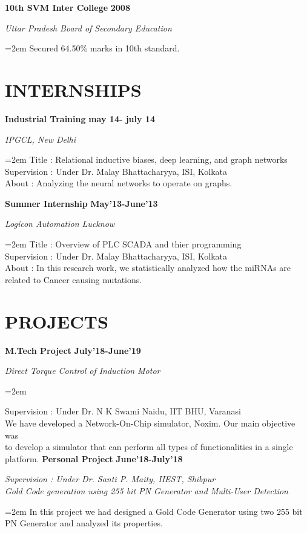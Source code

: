 \documentclass[paper=a4,fontsize=11pt]{scrartcl} %
\newcommand{\sepspace}{\vspace*{1em}}		%
\newcommand{\NewPart}[1]{\section*{\uppercase{#1}}}
\newcommand{\EducationEntry}[4]{
		\noindent \textbf{#1} \hfill      %
		\textbf{#2} \par  %
		\noindent \textit{#3} \par        %
		\noindent\hangindent=2em\hangafter=0 \small #4 %
		\normalsize \par}
\newcommand{\WorkEntry}[4]{				  %
		\noindent \textbf{#1} \hfill      %
		\textbf{#2} \par  %
		\noindent \textit{#3} \par              %
		\noindent\hangindent=2em\hangafter=0 \small #4 %
		\normalsize \par}
\begin{document}
            \EducationEntry{10th SVM Inter College}{2008}{Uttar Pradesh Board of
            Secondary Education}{Secured 64.50\% marks in 10th standard.}

    \NewPart{Internships}
{}
           \WorkEntry{Industrial Training} %
           {may 14- july 14} %
           {IPGCL, New Delhi} %
           {Title : Relational inductive biases, deep learning, and graph networks\\Supervision : Under Dr. Malay Bhattacharyya, ISI, Kolkata\\About : Analyzing the neural networks to operate on graphs.} %
    \sepspace
             \sepspace
    \WorkEntry{Summer Internship}{May'13-June'13}{Logicon Automation Lucknow}{Title : Overview of PLC SCADA and thier programming\\Supervision : Under Dr. Malay Bhattacharyya, ISI, Kolkata\\About : In this research work, we statistically analyzed how the miRNAs are related to Cancer causing
    mutations.}    

\NewPart{Projects}{}

        \WorkEntry{M.Tech Project} %
        {July'18-June'19} %
        {Direct Torque Control of Induction Motor} %
        \sepspace
    {Supervision : Under Dr. N K Swami Naidu, IIT BHU, Varanasi\\We have developed a Network-On-Chip simulator, Noxim. Our main objective was \\to develop a simulator that can perform all types of functionalities in a single platform.}
    \WorkEntry{Personal Project}{June'18-July'18}{Supervision : Under Dr. Santi P. Maity, IIEST, Shibpur\\Gold Code generation using 255 bit PN Generator and Multi-User Detection}{In this project we had designed a Gold Code Generator using two 255 bit PN Generator and analyzed its
    properties.}
    \sepspace
\end{document}
